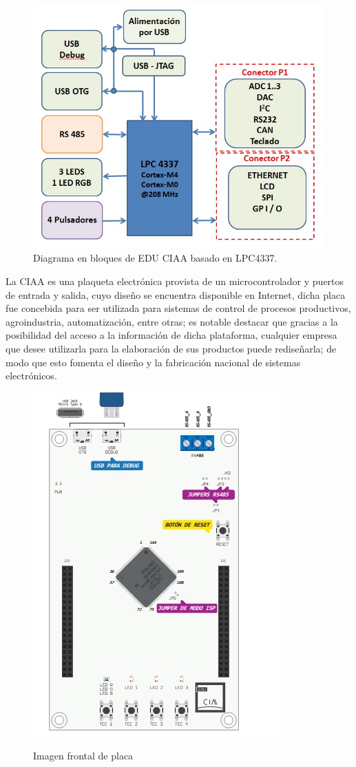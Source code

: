 \documentclass[12pt,letterpaper]{article}
\begin{document}
\begin{figure}[!h]
\centering
\includegraphics[width=8 cm]{figuras/diagramaenbloques.jpg}
\caption{Diagrama en bloques de EDU CIAA basado en LPC4337.}
\label{Fig1}
\end{figure}



La CIAA es una plaqueta electrónica provista de un microcontrolador y puertos de entrada y salida, cuyo diseño se encuentra disponible en Internet, dicha placa fue concebida para ser utilizada para sistemas de control de procesos productivos, agroindustria, automatización, entre otras; es notable destacar que gracias a la posibilidad del acceso a la información de dicha plataforma, cualquier empresa que desee utilizarla para la elaboración de sus productos puede rediseñarla; de modo que esto fomenta el diseño y la fabricación nacional de sistemas electrónicos.\\

\begin{figure}[!h]
\centering
\includegraphics[width=8 cm]{figuras/FIGURA_1.jpg}\\
\caption{Imagen frontal de placa}
\label{Fig2}
\end{figure}
\end{document}
